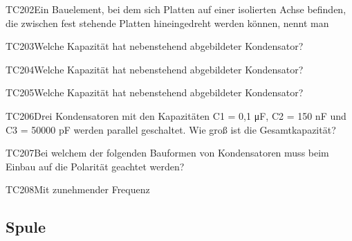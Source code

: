 \begin{question}{TC202}{Ein Bauelement, bei dem sich Platten auf einer isolierten Achse befinden, die zwischen fest stehende Platten hineingedreht werden können, nennt man}
\end{question}

\begin{question}{TC203}{Welche Kapazität hat nebenstehend abgebildeter Kondensator?}
\end{question}

\begin{question}{TC204}{Welche Kapazität hat nebenstehend abgebildeter Kondensator?}
\end{question}

\begin{question}{TC205}{Welche Kapazität hat nebenstehend abgebildeter Kondensator?}
\end{question}

\begin{question}{TC206}{Drei Kondensatoren mit den Kapazitäten C1 = 0,1 μF, C2 = 150 nF und C3 = 50000 pF werden parallel geschaltet. Wie groß ist die Gesamtkapazität?}
\end{question}

\begin{question}{TC207}{Bei welchem der folgenden Bauformen von Kondensatoren muss beim Einbau auf die Polarität geachtet werden?}
\end{question}

\begin{question}{TC208}{Mit zunehmender Frequenz}
\end{question}

\subsection{Spule}

